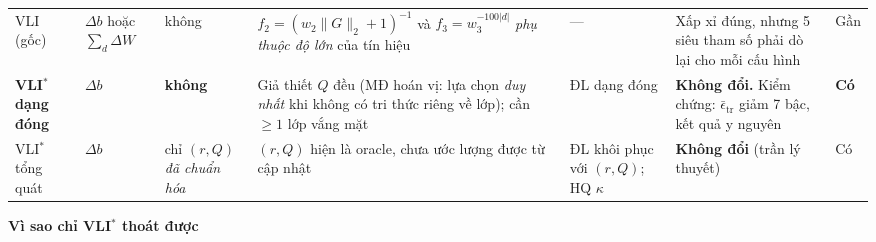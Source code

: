 \documentclass[11pt]{article}
\begin{document}
\begin{tabular}{@{}l p{2.1cm} p{2.0cm} p{5.4cm} p{2.7cm} p{5.4cm} p{1.3cm}@{}}
\midrule

VLI (gốc) &
$\Delta b$ hoặc $\sum_d\Delta W$ &
không &
$f_2=(w_2\|G\|_2{+}1)^{-1}$ và $f_3=w_3^{-100|d|}$ \emph{phụ thuộc độ lớn}
của tín hiệu &
--- &
Xấp xỉ đúng, nhưng 5 siêu tham số phải dò lại cho mỗi cấu hình &
Gần \\

\textbf{VLI}$^\ast$ \textbf{dạng đóng} &
$\Delta b$ &
\textbf{không} &
Giả thiết $Q$ đều (MĐ hoán vị: lựa chọn \emph{duy nhất} khi không có tri thức
riêng về lớp); cần $\ge1$ lớp vắng mặt &
ĐL dạng đóng &
\textbf{Không đổi.} Kiểm chứng: $\bar\epsilon_{\text{tr}}$ giảm 7 bậc, kết
quả y nguyên &
\textbf{Có} \\

VLI$^\ast$ tổng quát &
$\Delta b$ &
chỉ $(r,Q)$ \emph{đã chuẩn hóa} &
$(r,Q)$ hiện là oracle, chưa ước lượng được từ cập nhật &
ĐL khôi phục với $(r,Q)$; HQ $\kappa$ &
\textbf{Không đổi} (trần lý thuyết) &
Có \\

\bottomrule
\end{tabular}

\vspace{1.0em}

\noindent\normalsize\textbf{Vì sao chỉ VLI$^\ast$ thoát được}
\end{document}
